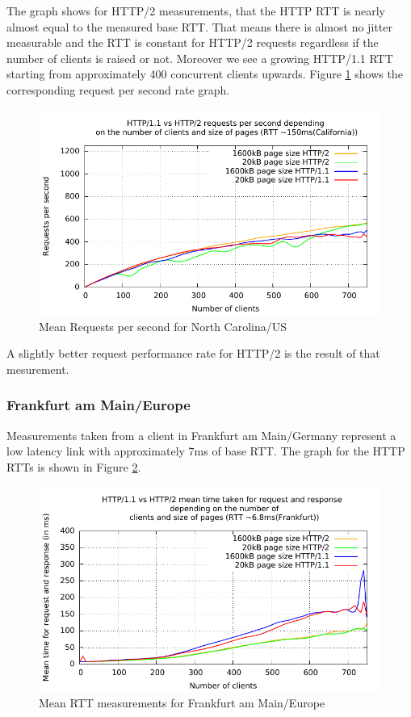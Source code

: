 The graph shows for HTTP/2 measurements, that the HTTP RTT is nearly almost equal to the measured base RTT. That means there is almost no jitter measurable and the RTT is constant for HTTP/2 requests regardless if the number of clients is raised or not. Moreover we see a growing HTTP/1.1 RTT starting from approximately 400 concurrent clients upwards. Figure \ref{fig:reqps-na} shows the corresponding request per second rate graph.

\begin{figure}[H]
	\centering
	\includegraphics[scale=1,trim=0.0cm .0cm .0cm .0cm,clip]{images/reqps-na.pdf}
	\caption{Mean Requests per second for North Carolina/US}
	\label{fig:reqps-na}
\end{figure}

A slightly better request performance rate for HTTP/2 is the result of that mesurement. 

\subsubsection{Frankfurt am Main/Europe}

Measurements taken from a client in Frankfurt am Main/Germany represent a low latency link with approximately 7ms of base RTT. The graph for the HTTP RTTs is shown in Figure \ref{fig:latency-europe}.

\begin{figure}[H]
	\centering
	\includegraphics[scale=1,trim=0.0cm .0cm .0cm .0cm,clip]{images/latency-frankfurt.pdf}
	\caption{Mean RTT measurements for Frankfurt am Main/Europe}
	\label{fig:latency-europe}
\end{figure}


